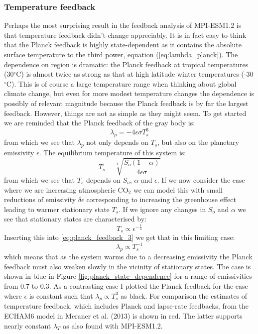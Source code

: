 \documentclass[12pt]{book}
\begin{document}
\subsubsection{Temperature feedback}
Perhaps the most surprising result in the feedback analysis of MPI-ESM1.2 is that temperature feedback didn't change appreciably. 
It is in fact easy to think that the Planck feedback is highly state-dependent as it contains the absolute surface temperature to the third power, equation (\ref{eq:lambda_planck}). The dependence on region is dramatic: the Planck feedback at tropical temperatures (30$^\circ$C) is almost twice as strong as that at high latitude winter temperatures (-30$^\circ$C). This is of course a large temperature range when thinking about global climate change, but even for more modest temperature changes the dependence is possibly of relevant magnitude because the Planck feedback is by far the largest feedback. However, things are not as simple as they might seem.
To get started we are reminded that the Planck feedback of the gray body is:
\begin{equation}
\lambda_p= -4 \epsilon \sigma T_s^3
\label{eq:planck_feedback_3}
\end{equation}
from which we see that $\lambda_p$ not only depends on $T_s$, but also on the planetary emissivity $\epsilon$. The equilibrium temperature of this system is:
$$
T_s = \sqrt[4]{\frac{S_o(1-\alpha)}{4\epsilon\sigma}}
$$
from which we see that $T_s$ depends on $S_o$, $\alpha$ and $\epsilon$. If we now consider the case where we are increasing atmospheric CO$_2$ we can model this with small reductions of emissivity $\delta \epsilon$ corresponding to increasing the greenhouse effect leading to warmer stationary state $T_s$.
If we ignore any changes in $S_o$ and $\alpha$ we see that stationary states are characterised by:
$$T_s \propto \epsilon^{-\frac{1}{4}}$$
Inserting this into \ref{eq:planck_feedback_3} we get that in this limiting case:
\begin{equation}
\lambda_p \propto T_s^{-1}
\end{equation}
which means that as the system warms due to a decreasing emissivity the Planck feedback must also weaken slowly in the vicinity of stationary states. The case is shown in blue in Figure \ref{fig:planck_state_dependence} for a range of emissivities from 0.7 to 0.3. As a contrasting case I plotted the Planck feedback for the case where $\epsilon$ is constant such that $\lambda_p \propto T_s^3$ as black. For comparison the estimates of temperature feedback, which includes Planck and lapse-rate feedbacks, from the ECHAM6 model in Meraner et al. (2013) is shown in red. The latter supports nearly constant $\lambda_T$ as also found with MPI-ESM1.2.
\end{document}
